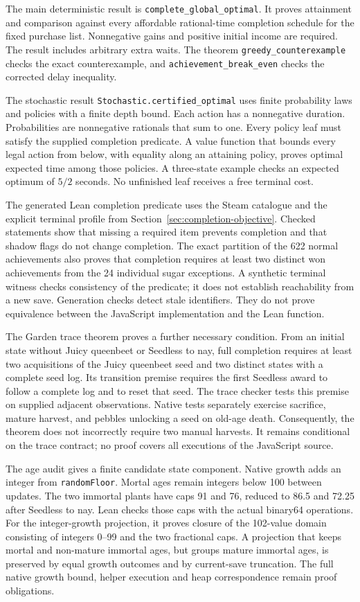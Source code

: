 \documentclass[11pt,a4paper]{article}
\numberwithin{equation}{section}
\theoremstyle{definition}
\theoremstyle{remark}
\begin{document}
The main deterministic result is \texttt{complete\_global\_optimal}. It proves attainment and comparison against every affordable rational-time completion schedule for the fixed purchase list. Nonnegative gains and positive initial income are required. The result includes arbitrary extra waits. The theorem \texttt{greedy\_counterexample} checks the exact counterexample, and \texttt{achievement\_break\_even} checks the corrected delay inequality.

The stochastic result \texttt{Stochastic.certified\_optimal} uses finite probability laws and policies with a finite depth bound. Each action has a nonnegative duration. Probabilities are nonnegative rationals that sum to one. Every policy leaf must satisfy the supplied completion predicate. A value function that bounds every legal action from below, with equality along an attaining policy, proves optimal expected time among those policies. A three-state example checks an expected optimum of $5/2$ seconds. No unfinished leaf receives a free terminal cost.

The generated Lean completion predicate uses the Steam catalogue and the explicit terminal profile from Section~\ref{sec:completion-objective}. Checked statements show that missing a required item prevents completion and that shadow flags do not change completion. The exact partition of the 622 normal achievements also proves that completion requires at least two distinct won achievements from the 24 individual sugar exceptions. A synthetic terminal witness checks consistency of the predicate; it does not establish reachability from a new save. Generation checks detect stale identifiers. They do not prove equivalence between the JavaScript implementation and the Lean function.

The Garden trace theorem proves a further necessary condition. From an initial state without Juicy queenbeet or Seedless to nay, full completion requires at least two acquisitions of the Juicy queenbeet seed and two distinct states with a complete seed log. Its transition premise requires the first Seedless award to follow a complete log and to reset that seed. The trace checker tests this premise on supplied adjacent observations. Native tests separately exercise sacrifice, mature harvest, and pebbles unlocking a seed on old-age death. Consequently, the theorem does not incorrectly require two manual harvests. It remains conditional on the trace contract; no proof covers all executions of the JavaScript source.

The age audit gives a finite candidate state component. Native growth adds an integer from \texttt{randomFloor}. Mortal ages remain integers below 100 between updates. The two immortal plants have caps 91 and 76, reduced to 86.5 and 72.25 after Seedless to nay. Lean checks those caps with the actual binary64 operations. For the integer-growth projection, it proves closure of the 102-value domain consisting of integers 0--99 and the two fractional caps. A projection that keeps mortal and non-mature immortal ages, but groups mature immortal ages, is preserved by equal growth outcomes and by current-save truncation. The full native growth bound, helper execution and heap correspondence remain proof obligations.
\end{document}
